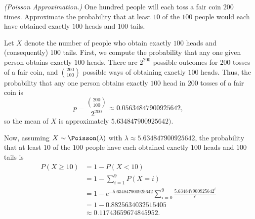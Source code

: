 \begin{problem}[Handout 10, \# 4]
  \emph{(Poisson Approximation.)} One hundred people will each toss a fair
  coin \(200\) times. Approximate the probability that at least \(10\) of
  the \(100\) people would each have obtained exactly \(100\) heads and
  \(100\) tails.
\end{problem}
\begin{solution}
  Let \(X\) denote the number of people who obtain exactly \(100\) heads
  and (consequently) \(100\) tails. First, we compute the probability that
  any one given person obtains exactly \(100\) heads. There are \(2^{200}\)
  possible outcomes for \(200\) tosses of a fair coin, and
  \(\binom{200}{100}\) possible ways of obtaining exactly \(100\)
  heads. Thus, the probability that any one person obtains exactly \(100\)
  head in \(200\) tosses of a fair coin is
  \[
    p=\frac{\binom{200}{100}}{2^{200}}\approx\num{0.05634847900925642},
  \]
  so the mean of \(X\) is approximately \(\num{5.634847900925642})\).

  Now, assuming \(X\sim\Poisson(\lambda)\) with
  \(\lambda\approx\num{5.634847900925642}\), the probability that at least
  \(10\) of the \(100\) people have each obtained exactly \(100\) heads and
  \(100\) tails is
  \begin{align*}
    P(X\geq 10)
    &=1-P(X<10)\\
    &=1-\sum_{i=1}^9 P(X=i)\\
    &=1
      -e^{-\num{5.634847900925642}}
      \sum_{i=0}^9\frac{\num{5.634847900925642}^i}{i!}\\
    &=1-\num{0.8825634032515405}\\
    &\approx \num{0.11743659674845952}.
  \end{align*}
\end{solution}
\newpage

